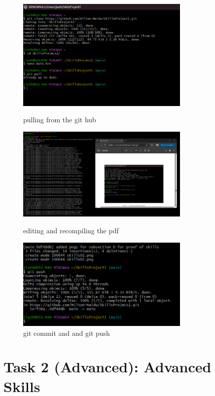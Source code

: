 \documentclass[a4paper, 11pt]{report}
\begin{document}
\begin{enumerate}
\begin{figure}
\centering
\includegraphics[width=0.75\textwidth]{skillsD1.png}
\caption{pulling from the git hub}

\includegraphics[width=0.75\textwidth]{skillsD2.png}
\caption{editing and recompiling the pdf}

\includegraphics[width=0.75\textwidth]{skillsD3.png}
\caption{git commit and and git push}
\end{figure}



\newpage
\section{Task 2 (Advanced): Advanced Skills}


\end{enumerate}
\end{document}
